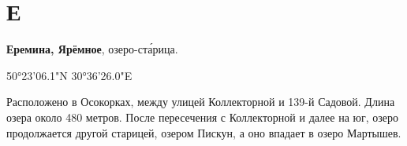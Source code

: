 \chapter*{Е}

\textbf{Еремина, Ярёмное}, озеро-ст\'арица. 

50°23'06.1"N 30°36'26.0"E

Расположено в Осокорках, между улицей Коллекторной и 139-й Садовой. Длина озера около 480 метров. После пересечения с Коллекторной и далее на юг, озеро продолжается другой старицей, озером Пискун, а оно впадает в озеро Мартышев.